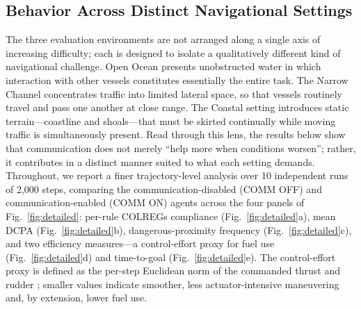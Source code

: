 \documentclass[final,5p,times,twocolumn]{elsarticle}
\begin{document}
\subsection{Behavior Across Distinct Navigational Settings}
\label{sec:detailed_analysis}
{\color{red}
The three evaluation environments are not arranged along a single axis of increasing difficulty; each is designed to isolate a qualitatively different kind of navigational challenge. Open Ocean presents unobstructed water in which interaction with other vessels constitutes essentially the entire task. The Narrow Channel concentrates traffic into limited lateral space, so that vessels routinely travel and pass one another at close range. The Coastal setting introduces static terrain---coastline and shoals---that must be skirted continually while moving traffic is simultaneously present. Read through this lens, the results below show that communication does not merely ``help more when conditions worsen''; rather, it contributes in a distinct manner suited to what each setting demands. Throughout, we report a finer trajectory-level analysis over 10 independent runs of 2{,}000 steps, comparing the communication-disabled (COMM OFF) and communication-enabled (COMM ON) agents across the four panels of Fig.~\ref{fig:detailed}: per-rule COLREGs compliance (Fig.~\ref{fig:detailed}a), mean DCPA (Fig.~\ref{fig:detailed}b), dangerous-proximity frequency (Fig.~\ref{fig:detailed}c), and two efficiency measures---a control-effort proxy for fuel use (Fig.~\ref{fig:detailed}d) and time-to-goal (Fig.~\ref{fig:detailed}e). The control-effort proxy is defined as the per-step Euclidean norm of the commanded thrust and rudder \citep{ControlEffort}; smaller values indicate smoother, less actuator-intensive maneuvering and, by extension, lower fuel use.

%

}
\end{document}
